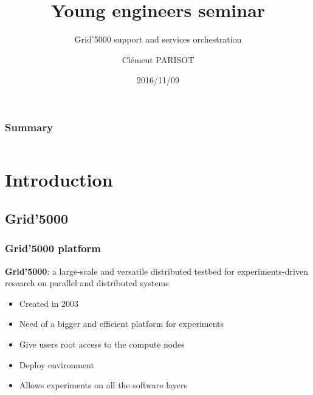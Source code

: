 \documentclass[11pt,compress]{beamer}
\author{Clément PARISOT}
\title{Young engineers seminar}
\subtitle{Grid'5000 support and services orchestration}
\institute{IJD INRIA Nancy\\MADYNES Team\vspace{2.75cm}}
\begin{document}
\date{\scriptsize 2016/11/09}

{
\begin{frame}[plain]
  \titlepage
\end{frame}
}
\addtocounter{framenumber}{-1}

\begin{frame}
\frametitle{Summary}
\begin{columns}[t]
  \begin{column}{5cm}
  \tableofcontents[sections={1-3},hideothersubsections]
  \end{column}
  \begin{column}{5cm}
  \tableofcontents[sections={4-6},hideothersubsections]
  \end{column}
  \end{columns}
\end{frame}

\section{Introduction}
\subsection{Grid'5000}
\begin{frame}
\frametitle{Grid'5000 platform}
\begin{block}{}
\textbf{Grid'5000}: a large-scale and versatile distributed testbed for experiments-driven research on parallel and distributed systems
\end{block}
\begin{itemize}
\item Created in 2003
\item Need of a bigger and efficient platform for experiments

\item Give users root access to the compute nodes
\item Deploy environment
\item Allows experiments on all the software layers
\end{itemize}
\end{frame}
\end{document}
